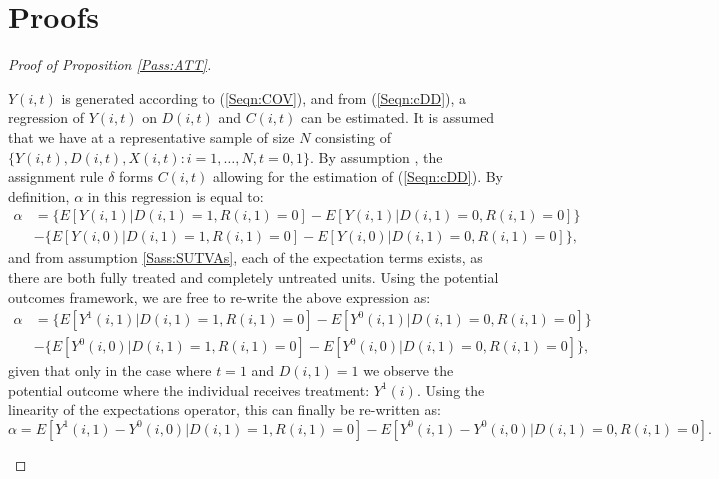 \section{Proofs}
\renewcommand{\qedsymbol}{$\blacksquare$}
\begin{proof}[Proof of Proposition \ref{Pass:ATT}]
\begin{footnotesize}
$Y(i,t)$ is generated according to (\ref{Seqn:COV}), and from (\ref{Seqn:cDD}),
a regression of $Y(i,t)$ on $D(i,t)$ and $C(i,t)$ can be estimated.  It is 
assumed that we have at a representative sample of size $N$ consisting of 
$\{Y(i,t),D(i,t),X(i,t): i=1, \ldots, N, t=0, 1\}$.  By assumption 
, the assignment rule $\delta$ forms $C(i,t)$ allowing for 
the estimation of (\ref{Seqn:cDD}). By definition, $\alpha$ in this regression 
is equal to:
\begin{equation}
\nonumber
\label{Seqn:alphaProof1}
\begin{split}
\alpha&=\{E[Y(i,1)|D(i,1)=1,R(i,1)=0]-E[Y(i,1)|D(i,1)=0,R(i,1)=0]\} \\
      &-\{E[Y(i,0)|D(i,1)=1,R(i,1)=0]-E[Y(i,0)|D(i,1)=0,R(i,1)=0]\},
\end{split}
\end{equation}
and from assumption \ref{Sass:SUTVAs}, each of the expectation terms exists, as 
there are both fully treated and completely untreated units. Using the potential 
outcomes framework, we are free to re-write the above expression as:
\begin{equation}
\nonumber
\label{Seqn:alphaProof2}
\begin{split}
\alpha&=\{E[Y^1(i,1)|D(i,1)=1,R(i,1)=0]-E[Y^0(i,1)|D(i,1)=0,R(i,1)=0]\} \\
      &-\{E[Y^0(i,0)|D(i,1)=1,R(i,1)=0]-E[Y^0(i,0)|D(i,1)=0,R(i,1)=0]\},
\end{split}
\end{equation}
given that only in the case where $t=1$ and $D(i,1)=1$ we observe the potential 
outcome where the individual receives treatment: $Y^1(i)$.  Using the linearity
of the expectations operator, this can finally be re-written as:
\begin{equation}
\nonumber
\label{Seqn:alphaProof3}
\alpha=E[Y^1(i,1)-Y^0(i,0)|D(i,1)=1,R(i,1)=0] - 
       E[Y^0(i,1)-Y^0(i,0)|D(i,1)=0,R(i,1)=0].
\end{equation}


\end{footnotesize}
\end{proof}
